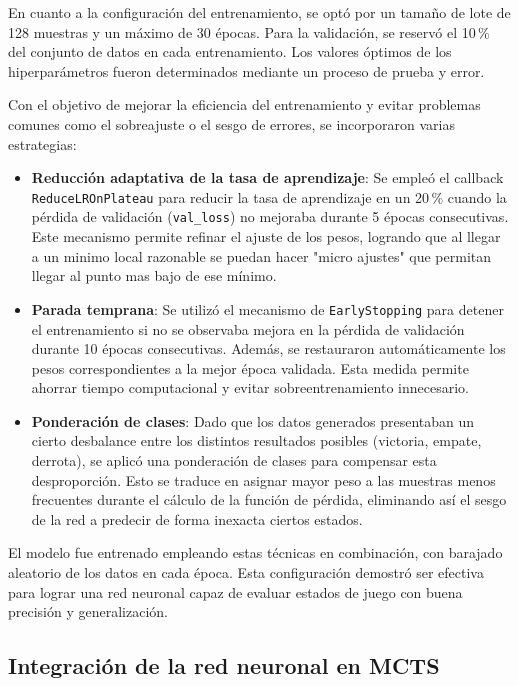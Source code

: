 \documentclass[conference]{IEEEtran}
\begin{document}
En cuanto a la configuración del entrenamiento, se optó por un tamaño de lote de 128 muestras y un máximo de 30 épocas. Para la validación, se reservó el 10\,\% del conjunto de datos en cada entrenamiento. Los valores óptimos de los hiperparámetros fueron determinados mediante un proceso de prueba y error.

Con el objetivo de mejorar la eficiencia del entrenamiento y evitar problemas comunes como el sobreajuste o el sesgo de errores, se incorporaron varias estrategias:

\begin{itemize}
    \item \textbf{Reducción adaptativa de la tasa de aprendizaje}: Se empleó el callback \texttt{ReduceLROnPlateau} para reducir la tasa de aprendizaje en un 20\,\% cuando la pérdida de validación (\texttt{val\_loss}) no mejoraba durante 5 épocas consecutivas. Este mecanismo permite refinar el ajuste de los pesos, logrando que al llegar a un minimo local razonable se puedan hacer "micro ajustes" que permitan llegar al punto mas bajo de ese mínimo.

    \item \textbf{Parada temprana}: Se utilizó el mecanismo de \texttt{EarlyStopping} para detener el entrenamiento si no se observaba mejora en la pérdida de validación durante 10 épocas consecutivas. Además, se restauraron automáticamente los pesos correspondientes a la mejor época validada. Esta medida permite ahorrar tiempo computacional y evitar sobreentrenamiento innecesario.

    \item \textbf{Ponderación de clases}: Dado que los datos generados presentaban un cierto desbalance entre los distintos resultados posibles (victoria, empate, derrota), se aplicó una ponderación de clases para compensar esta desproporción. Esto se traduce en asignar mayor peso a las muestras menos frecuentes durante el cálculo de la función de pérdida, eliminando así el sesgo de la red a predecir de forma inexacta ciertos estados.
\end{itemize}

El modelo fue entrenado empleando estas técnicas en combinación, con barajado aleatorio de los datos en cada época. Esta configuración demostró ser efectiva para lograr una red neuronal capaz de evaluar estados de juego con buena precisión y generalización.




\subsection{Integración de la red neuronal en MCTS}
\end{document}
